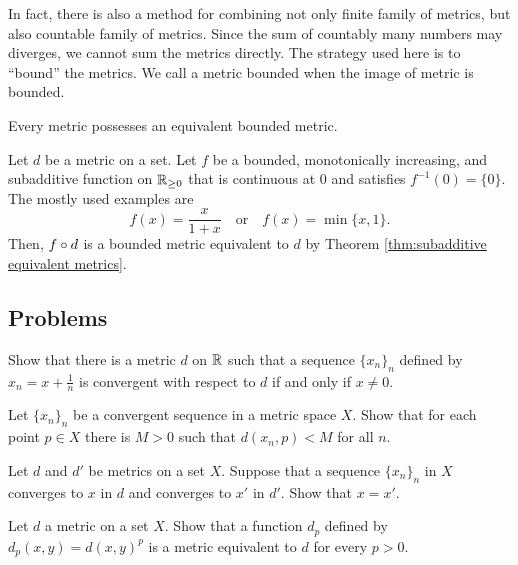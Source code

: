 \documentclass{../crs}
\begin{document}
In fact, there is also a method for combining not only finite family of metrics, but also countable family of metrics.
Since the sum of countably many numbers may diverges, we cannot sum the metrics directly.
The strategy used here is to ``bound'' the metrics.
We call a metric bounded when the image of metric is bounded.

\begin{prop}
Every metric possesses an equivalent bounded metric.
\end{prop}
\begin{pf}
Let $d$ be a metric on a set.
Let $f$ be a bounded, monotonically increasing, and subadditive function on $\mathbb{R}_{\ge0}$ that is continuous at 0 and satisfies $f^{-1}(0)=\{0\}$.
The mostly used examples are
\[f(x)=\frac x{1+x}\quad\text{or}\quad f(x)=\min\{x,1\}.\]
Then, $f\circ d$ is a bounded metric equivalent to $d$ by Theorem \ref{thm:subadditive equivalent metrics}.
\end{pf}

















\subsection*{Problems}
\begin{prb}
Show that there is a metric $d$ on $\mathbb{R}$ such that a sequence $\{x_n\}_n$ defined by $x_n=x+\frac1n$ is convergent with respect to $d$ if and only if $x\ne0$.
\end{prb}
\begin{prb}
Let $\{x_n\}_n$ be a convergent sequence in a metric space $X$.
Show that for each point $p\in X$ there is $M>0$ such that $d(x_n,p)<M$ for all $n$.
\end{prb}
\begin{prb}
Let $d$ and $d'$ be metrics on a set $X$.
Suppose that a sequence $\{x_n\}_n$ in $X$ converges to $x$ in $d$ and converges to $x'$ in $d'$.
Show that $x=x'$.
\end{prb}
\begin{prb}
Let $d$ a metric on a set $X$.
Show that a function $d_p$ defined by $d_p(x,y)=d(x,y)^p$ is a metric equivalent to $d$ for every $p>0$.
\end{prb}
\end{document}
